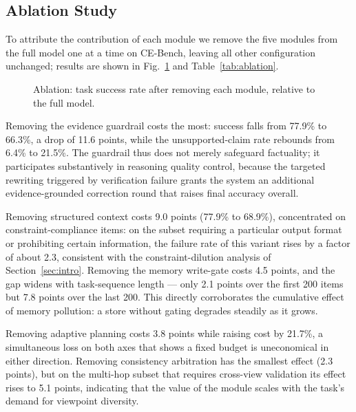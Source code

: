 \documentclass[journal,10pt,a4paper]{IEEEtran}
\begin{document}
\subsection{Ablation Study}
To attribute the contribution of each module we remove the five modules from the full model one at a time on CE-Bench, leaving all other configuration unchanged; results are shown in Fig.~\ref{fig:ablation} and Table~\ref{tab:ablation}.

\begin{figure}[t]
\centering
{}
\caption{Ablation: task success rate after removing each module, relative to the full model.}
\label{fig:ablation}
\end{figure}

Removing the evidence guardrail costs the most: success falls from 77.9\% to 66.3\%, a drop of 11.6 points, while the unsupported-claim rate rebounds from 6.4\% to 21.5\%. The guardrail thus does not merely safeguard factuality; it participates substantively in reasoning quality control, because the targeted rewriting triggered by verification failure grants the system an additional evidence-grounded correction round that raises final accuracy overall.

Removing structured context costs 9.0 points (77.9\% to 68.9\%), concentrated on constraint-compliance items: on the subset requiring a particular output format or prohibiting certain information, the failure rate of this variant rises by a factor of about 2.3, consistent with the constraint-dilution analysis of Section~\ref{sec:intro}. Removing the memory write-gate costs 4.5 points, and the gap widens with task-sequence length --- only 2.1 points over the first 200 items but 7.8 points over the last 200. This directly corroborates the cumulative effect of memory pollution: a store without gating degrades steadily as it grows.

Removing adaptive planning costs 3.8 points while raising cost by 21.7\%, a simultaneous loss on both axes that shows a fixed budget is uneconomical in either direction. Removing consistency arbitration has the smallest effect (2.3 points), but on the multi-hop subset that requires cross-view validation its effect rises to 5.1 points, indicating that the value of the module scales with the task's demand for viewpoint diversity.
\end{document}
